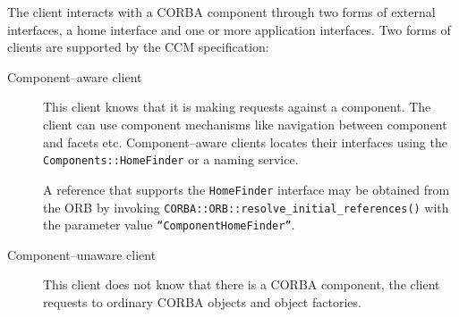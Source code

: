 The client interacts with a CORBA component through two forms of external
interfaces, a home interface and one or more application interfaces. Two forms
of clients are supported by the CCM specification:
\begin{description}
\item [Component--aware client] 
This client knows that it is making requests against a component. The client can
use component mechanisms like navigation between component and facets etc.
Component--aware clients locates their interfaces using the {\tt
Components::HomeFinder} or a naming service.

A reference that supports the {\tt HomeFinder} interface may be obtained from
the ORB by invoking {\tt CORBA::ORB::resolve\_initial\_references()} with the
parameter value {\tt ``ComponentHomeFinder''}.

\item [Component--unaware client]
This client does not know that there is a CORBA component, the client requests
to ordinary CORBA objects and object factories.
\end{description}



